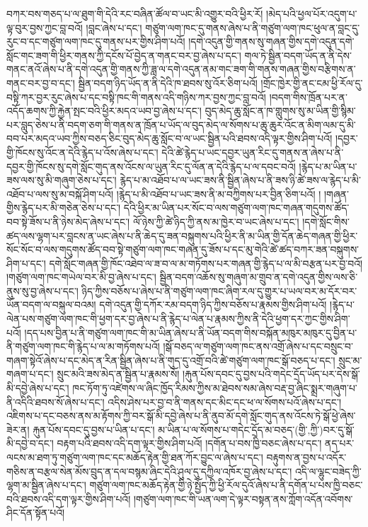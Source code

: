 བཀར་བས་གཅད་པ་ལ་ཐུག་གི་དེའི་རང་བཞིན་ཚོལ་བ་ཡང་མི་འགྱུར་བའི་ཕྱིར་རོ། །མེད་པའི་ཕྱལ་པོར་འདུག་པ་ལྟ་བུར་བྱས་ཀྱང་བླ་བའོ། །བླང་ཞེས་པ་དང་། གཙུག་ལག་ཁང་དུ་གནས་ཞེས་པ་ནི་གཙུག་ལག་ཁང་ཕུལ་ན་བླང་དུ་རུང་བ་དང་གཙུག་ལག་ཁང་དུ་གནས་པར་གྱིས་ཤིག་པའོ། །དགེ་འདུན་གྱི་གནས་སུ་གཞན་གྱིས་དགེ་འདུན་དགེ་སློང་གང་ཟག་གི་ཕྱིར་གནས་ཀྱི་དངོས་པོ་བྱེད་ན་གནང་བར་བྱ་ཞེས་པ་དང་། གལ་ཏེ་སྦྱིན་བདག་ཡོད་ན་ནི་དེས་གནང་ནའོ་ཞེས་པ་ནི་དགེ་འདུན་གྱི་གནས་ཀྱི་ཟླ་ལ་དགེ་འདུན་ནམ་གང་ཟག་གི་གནས་གཞན་གྱིས་བརྩིགས་ན་གནང་བར་བྱ་བ་དང་། སྦྱིན་བདག་ཉིད་ཡོད་ན་ནི་དེའི་ཁ་ཐབས་སུ་འོར་ཅིག་པའོ། །གྲོང་ཁྱེར་གྱི་ནང་ངམ་ཕྱི་རོལ་དུ་བསྟི་ཀར་བྱར་རུང་ཞེས་པ་དང་བསྟི་ཁང་གི་གནས་འདི་གཉིས་ཀར་བྱས་ཀྱང་བླ་བའོ། །བདག་གིས་ཁྲོན་པར་ན་འདོད་ཆགས་ཀྱི་རྐྱེན་སྤང་བའི་ཕྱིར་མདའ་ཡབ་བྱ་ཞེས་པ་དང་། བུད་མེད་ཆུ་སློང་ན་ཁ་གླུགས་སུ་མ་ཡིན་གྱི་སྙིམ་པར་བླུད་ཅེས་པ་ནི་བདག་ཅག་གི་གནས་ན་ཁྲོན་པ་ཡོད་ལ་བུད་མེད་ལ་སོགས་པ་ཆུ་ཆུར་འོང་ན་མིག་ལམ་དུ་མི་བབ་པར་མདའ་ཡབ་ཀྱིས་བཅད་ཅིང་བུད་མེད་ཆུ་སློང་བ་ལ་ཡང་སྦྱིན་པའི་ཐབས་འདི་ལྟར་གྱིས་ཤིག་པའོ། །དབྱར་གྱི་ཁོངས་སུ་འོང་ན་དེའི་རྙེད་པ་འོས་ཞེས་པ་དང་། དེའི་ཚེ་རྙེད་པ་ཡང་དབྱར་ཡུན་རིང་དུ་གནས་ན་ཞེས་པ་ནི་དབྱར་གྱི་ཁོངས་སུ་དགེ་སློང་གུད་ནས་འོངས་ལ་ཡུན་རིང་དུ་ལོན་ན་དེའི་རྙེད་པ་ལ་དབང་བའོ། །རྙེད་པ་མ་ཡིན་པ་ཟས་ལས་སུ་མི་གཞུག་ཅེས་པ་དང་། རྙེད་པ་མ་འཐོབ་པ་ལ་ཡང་ཟས་ནི་སྦྱིན་ཞེས་པ་ནི་ཟས་ཉི་ཚེ་ཟས་ལ་རྙེད་པ་མི་འཐོབ་པ་ལས་སུ་མ་བསྐོ་ཤིག་པའོ། །རྙེད་པ་མི་འཐོབ་པ་ཡང་ཟས་ནི་མ་བཀྱིགས་པར་བྱིན་ཅིག་པའོ། ། །གཞན་གྱིས་རྙེད་པར་མི་གཅེན་ཅེས་པ་དང་། དེའི་ཕྱིར་མ་ཡིན་པར་སོང་བ་ལས་གཙུག་ལག་ཁང་གཞན་གདུགས་ཚོད་བབ་སྟེ་ཟོས་པ་ནི་ཉེས་མེད་ཞེས་པ་དང་། ལོ་ཉེས་ཀྱི་ཚེ་ཉིད་ཀྱི་ནས་མ་ཁྱེར་བ་ཡང་ཞེས་པ་དང་། །དགེ་སློང་གིས་ཚད་ལས་ལྷག་པར་བླངས་ན་ཡང་ཞེས་པ་ནི་ཆེད་དུ་ཟན་བསྐུགས་པའི་ཕྱིར་ནི་མ་ཡིན་གྱི་དོན་ཆེད་གཞན་གྱི་ཕྱིར་སོང་སོང་བ་ལས་གདུགས་ཚོད་བབ་སྟེ་གཙུག་ལག་ཁང་གཞན་དུ་ཟོས་པ་དང་མུ་གེའི་ཚེ་ཚད་བཀར་ཟན་བསྐུགས་ཤིག་པ་དང་། དགེ་སློང་གཞན་གྱི་ཁོང་འཐེབ་ལ་ཟ་བ་ལ་མ་གཏོགས་པར་གཞན་གྱི་རྙེད་པ་ལ་མི་བརྩན་པར་བྱ་བའོ། །གཙུག་ལག་ཁང་གཡེལ་བར་མི་བྱ་ཞེས་པ་དང་། སྦྱིན་བདག་འཆོས་སུ་གཞུག་མ་གྲུབ་ན་དགེ་འདུན་གྱིས་ལས་ཅི་ནུས་སུ་བྱ་ཞེས་པ་དང་། ཉིད་ཀྱིས་བཅོས་པ་ཞེས་པ་ནི་གཙུག་ལག་ཁང་ཞིག་རལ་དུ་གྱུར་པ་ཡལ་བར་མ་དོར་བར་ཡོན་བདག་ལ་བསྐུལ་བའམ། དགེ་འདུན་གྱི་དཀོར་རམ་བདག་ཉིད་ཀྱིས་བཅོས་པ་རྣམས་གྱིས་ཤིག་པའོ། །རྙེད་པ་ལེན་པས་གཙུག་ལག་ཁང་གི་ཕྱག་དར་བྱ་ཞེས་པ་ནི་རྙེད་པ་ལེན་པ་རྣམས་ཀྱིས་ནི་དེའི་ཕྱག་དར་ཀྱང་གྱིས་ཤིག་པའོ། །དད་པས་བྱིན་པ་ནི་གཙུག་ལག་ཁང་གི་མ་ཡིན་ཞེས་པ་ནི་ཡོན་བདག་གིས་བསྐོན་མཁུར་མཁུར་དུ་བྱིན་པ་ནི་གཙུག་ལག་ཁང་གི་རྙེད་པ་ལ་མ་གཏོགས་པའོ། །སྒོ་བཅད་ལ་གཙུག་ལག་ཁང་ནས་འགྲོ་ཞེས་པ་དང་བསྲུང་བ་གཞག་སྟེའོ་ཞེས་པ་དང་མེད་ན་རིན་སྦྱིན་ཞེས་པ་ནི་གུད་དུ་འགྲོ་བའི་ཚེ་གཙུག་ལག་ཁང་སྒོ་བཅད་པ་དང་། སྲུང་མ་གཞག་པ་དང་། སྲུང་མའི་ཟས་མེད་ན་སྦྱིན་པ་རྣམས་སོ། །རྐུན་པོས་དབང་དུ་བྱས་པའི་གདེང་དྲོད་ཡོད་པར་དེས་སྒོ་མི་དབྱེ་ཞེས་པ་དང་། ཁང་ཏོག་ཏུ་འཛེགས་ལ་ཞིང་ཁྱོད་རིམས་ཀྱིས་མ་ཐེབས་སམ་ཞེས་བརྡ་བྱ་ཞིང་སྨྲར་གཞུག་པ་ནི་འདིའི་ཐབས་སོ་ཞེས་པ་དང་། འདིས་ཤེས་པར་བྱ་བ་ནི་གནས་དང་མིང་དང་ཕ་ལ་སོགས་པའོ་ཞེས་པ་དང་། འཇིགས་པ་དང་བཅས་ནས་མ་རྟོགས་ཀྱི་བར་སྒོ་མི་དབྱེ་ཞེས་པ་ནི་ནུབ་མོ་དགེ་སློང་གུད་ནས་འོངས་ཏེ་སྒོ་ཕྱེ་ཞེས་ཟེར་ན། རྐུན་པོས་དབང་དུ་བྱས་པ་ཡིན་པ་དང་། མ་ཡིན་པ་ལ་སོགས་པ་གདེང་དྲོད་མ་བཅད་(གྱི་‚ཀྱི་)བར་དུ་སྒོ་མི་དབྱེ་བ་དང་། བརྟག་པའི་ཐབས་འདི་དག་ལྟར་གྱིས་ཤིག་པའོ། །དགོན་པ་བས་ཁྱི་བཅང་ཞེས་པ་དང་། ནད་པར་ལངས་མ་ཐག་ཏུ་གཙུག་ལག་ཁང་དང་མཆོད་རྟེན་གྱི་ཐན་ཀོར་བྱུང་ལ་ཞེས་པ་དང་། བརྟུགས་ན་བྱས་པ་འདོར་གཅིས་ན་བརྩལ་སེན་མོས་བྲུད་ན་དལ་བསྙམ་ཞིང་དེའི་ཤུལ་དུ་དཀྱིལ་འཁོར་བྱ་ཞེས་པ་དང་། འདི་ལ་ལྷུང་བཟེད་ཀྱི་ལྷག་མ་སྦྱིན་ཞེས་པ་དང་། གཙུག་ལག་ཁང་མཆོད་རྟེན་གྱི་ཉེ་སྤྱོད་ཀྱི་ཕྱི་རོལ་དུའོ་ཞེས་པ་ནི་དགོན་པ་པས་ཁྱི་བཅང་བའི་ཐབས་འདི་དག་ལྟར་གྱིས་ཤིག་པའོ། །གཙུག་ལག་ཁང་གི་ཡན་ལག་དེ་ལྟར་བསྟན་ནས་ཀློག་འདོན་འབོགས་ཤིང་དོན་སྟོན་པའོ། 